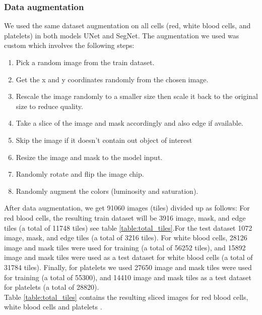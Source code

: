 \documentclass[conference]{IEEEtran}
\begin{document}
\subsubsection{Data augmentation}
We used the same dataset augmentation on all cells (red, white blood cells, and platelets) in both models UNet and SegNet.
The augmentation we used was custom which involves the following steps:
\begin{enumerate}
    \item Pick a random image from the train dataset.
    \item Get the x and y coordinates randomly from the chosen image.
    \item Rescale the image randomly to a smaller size then scale it back to the original size to reduce quality.
    \item Take a slice of the image and mask accordingly and also edge if available.
    \item Skip the image if it doesn't contain out object of interest
    \item Resize the image and mask to the model input.
    \item Randomly rotate and flip the image chip.
    \item Randomly augment the colors (luminosity and saturation).
\end{enumerate}
After data augmentation, we get 91060 images (tiles)  divided up as follows:
For red blood cells, the resulting train dataset will be 3916 image, mask, and edge tiles (a total of 11748 tiles) see table \ref{table:total_tiles}.For the test dataset 1072 image, mask, and edge tiles (a total of 3216 tiles).
For white blood cells, 28126 image and mask tiles were used for training (a total of 56252 tiles), and 15892 image and mask tiles were used as a test dataset for white blood cells (a total of 31784 tiles).
Finally, for platelets we used 27650 image and mask tiles were used for training (a total of 55300), and 14410 image and mask tiles as a test dataset for platelets (a total of 28820).\\
Table \ref{table:total_tiles}  contains the resulting sliced images for red blood cells, white blood cells and platelets .


\vspace*{-0.5cm}
\end{document}
